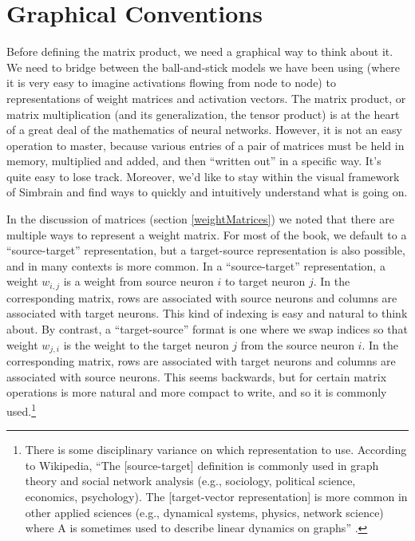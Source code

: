 \section{Graphical Conventions}\label{sourceTarget} 



Before defining the matrix product, we need a graphical way to think about it. We need to bridge between the ball-and-stick models we have been using (where it is very easy to imagine activations flowing from node to node) to representations of weight matrices and activation vectors. The matrix product, or matrix multiplication (and its generalization, the tensor product) is at the heart of a great deal of the mathematics of neural networks. However, it is not an easy operation to master, because various entries of a pair of matrices must be held in memory, multiplied and added, and then ``written out'' in a specific way. It's quite easy to lose track. Moreover, we'd like to stay within the visual framework of Simbrain and find ways to quickly and intuitively understand what is going on. 

In the discussion of matrices (section \ref{weightMatrices}) we noted that there are multiple ways to represent a weight matrix. For most of the book, we default to a ``source-target'' representation, but a target-source representation is also possible, and in many contexts is more common. In a ``source-target'' representation, a weight $w_{i, j}$ is a weight from source neuron $i$ to target neuron $j$. In the corresponding matrix, rows are associated with source neurons and columns are associated with target neurons. This kind of indexing is easy and natural to think about. By contrast, a ``target-source'' format is one where we swap indices so that weight $w_{j, i}$ is the weight to the target neuron $j$ from the source neuron $i$. In the corresponding matrix, rows are associated with target neurons and columns are associated with source neurons. This seems backwards, but for certain matrix operations is more natural and more compact to write, and so it is commonly used.\footnote{There is some disciplinary variance on which representation to use. According to Wikipedia, ``The [source-target] definition is commonly used in graph theory and social network analysis (e.g., sociology, political science, economics, psychology). The [target-vector representation] is more common in other applied sciences (e.g., dynamical systems, physics, network science) where A is sometimes used to describe linear dynamics on graphs'' .}


